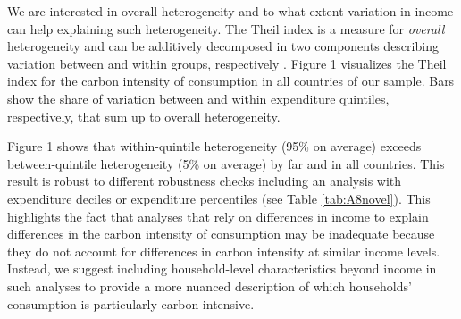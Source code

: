 \documentclass[11pt]{article}
\begin{document}
\begin{revisionbox}
    We are interested in overall heterogeneity and to what extent variation in income can help explaining such heterogeneity. The Theil index is a measure for \textit{overall} heterogeneity and can be additively decomposed in two components describing variation between and within groups, respectively \autocite{Shorrocks.1980,Cowell.2011a}. Figure 1 visualizes the Theil index for the carbon intensity of consumption in all countries of our sample. Bars show the share of variation between and within expenditure quintiles, respectively, that sum up to overall heterogeneity. 


    Figure 1 shows that within-quintile heterogeneity (95\% on average) exceeds between-quintile heterogeneity (5\% on average) by far and in all countries. This result is robust to different robustness checks including an analysis with expenditure deciles or expenditure percentiles (see Table \ref{tab:A8novel}). This highlights the fact that analyses that rely on differences in income to explain differences in the carbon intensity of consumption may be inadequate because they do not account for differences in carbon intensity at similar income levels. Instead, we suggest including household-level characteristics beyond income in such analyses to provide a more nuanced description of which households' consumption is particularly carbon-intensive.
\end{revisionbox}
\end{document}
